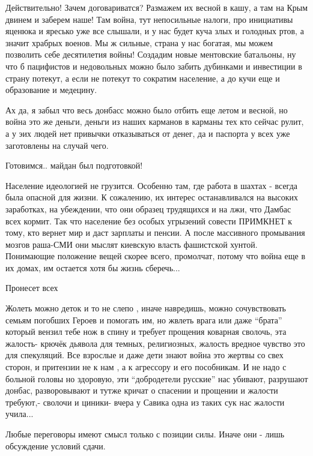 \begin{itemize}
Действительно! Зачем договариватся? Размажем их весной в кашу, а там на Крым
двинем и заберем наше! Там война, тут непосильные налоги, про инициативы
яценюка и яресько уже все слышали, и у нас будет куча злых и голодных ртов, а
значит храбрых военов. Мы ж сильные, страна у нас богатая, мы можем позволить
себе десятилетия войны! Создадим новые ментовские батальоны, ну что б
пацифистов и недовольных можно было забить дубинками и инвестиции в страну
потекут, а если не потекут то сократим население, а до кучи еще и образование и
медецину.

Ах да, я забыл что весь донбасс можно было отбить еще летом и весной, но война
это же деньги, деньги из наших карманов в карманы тех кто сейчас рулит, а у эих
людей нет привычки отказываться от денег, да и паспорта у всех уже заготовлены
на случай чего.


Готовимся.. майдан был подготовкой!


Население идеологией не грузится. Особенно там, где работа в шахтах - всегда
была опасной для жизни. К сожалению, их интерес останавливался на высоких
заработках, на убеждении, что они образец трудящихся и на лжи, что Дамбас всех
кормит. Так что население без особых угрызений совести ПРИМКНЕТ к тому, кто
вернет мир и даст зарплаты и пенсии. А после массивного промывания мозгов
раша-СМИ они мыслят киевскую власть фашистской хунтой. Понимающие положение
вещей скорее всего, промолчат, потому что война еще в их домах, им остается
хотя бы жизнь сберечь...

Пронесет всех


Жолеть можно деток и то не слепо , иначе навредишь, можно сочувствовать семьям
погобших Героев и помогать им, но жвлеть врага или даже \enquote{брата} который вензил
тебе нож в спину и требует прощения коварная сволочь, эта жалость- крючёк
дьявола для темных, религиозных, жалость вредное чувство это для спекуляций.
Все взрослые и даже дети знают война это жертвы со свех сторон, и притензии не
к нам , а к агрессору и его пособникам. И не надо с больной головы но здоровую,
эти \enquote{добродетели русские} нас убивают, разрушают донбас, разворовывают и тутже
кричат о спасении и прощении и жалости требуют,- сволочи и циники- вчера у
Савика одна из таких сук нас жалости учила...


Любые переговоры имеют смысл только с позиции силы. Иначе они - лишь обсуждение условий сдачи.


\end{itemize}
